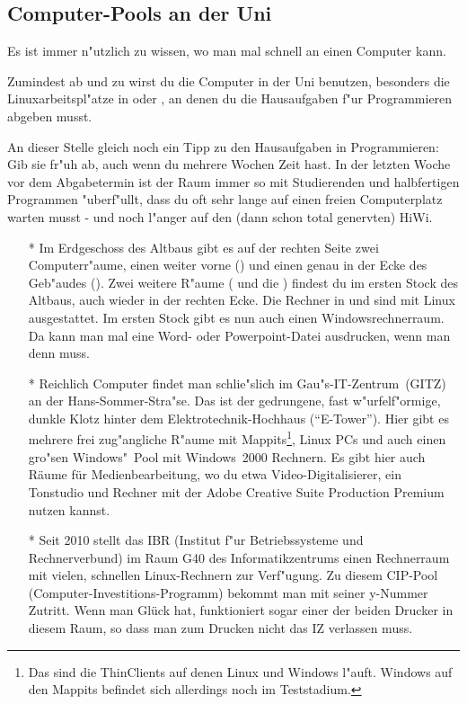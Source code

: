 \subsection{Computer-Pools an der Uni}
Es ist immer n"utzlich zu wissen, wo man mal schnell an einen Computer kann.

Zumindest ab und zu wirst du die Computer in der Uni benutzen, besonders
die Linuxarbeitspl"atze in  oder , an denen du die Hausaufgaben f"ur
Programmieren abgeben musst.

{\small
An dieser Stelle gleich noch ein Tipp zu den Hausaufgaben in Programmieren:
Gib sie fr"uh ab, auch wenn du mehrere Wochen Zeit hast. In der letzten Woche
vor dem Abgabetermin ist der Raum immer so mit Studierenden und halbfertigen
Programmen "uberf"ullt, dass du oft sehr lange auf einen freien Computerplatz
warten musst - und noch l"anger auf den (dann schon total genervten) HiWi.
}

\begin{itemize}

\item[*] Im Erdgeschoss des Altbaus gibt es auf der rechten Seite zwei
Computerr"aume, einen weiter vorne () und einen genau in der Ecke
des Geb"audes (). Zwei weitere R"aume ( und die
) findest du im ersten Stock des Altbaus, auch wieder in
der rechten Ecke. Die Rechner in  und  sind mit Linux
ausgestattet. Im ersten Stock gibt es nun auch einen Windowsrechnerraum. Da kann man mal eine Word- oder
Powerpoint-Datei ausdrucken, wenn man denn muss.

\item[*] Reichlich Computer findet man schlie"slich im Gau"s-IT-Zentrum~(GITZ) an der
Hans-Sommer-Stra"se. Das ist der gedrungene, fast w"urfelf"ormige, dunkle
Klotz hinter dem Elektrotechnik-Hochhaus ("`E-Tower"'). Hier gibt es mehrere frei
zug"angliche R"aume mit Mappits\footnote{Das sind die ThinClients auf denen
Linux und Windows l"auft. Windows auf den Mappits befindet sich allerdings noch
im Teststadium.}, Linux PCs und auch einen gro"sen Windows"~Pool mit
Windows~2000 Rechnern. Es gibt hier auch Räume für Medienbearbeitung, wo du etwa
Video-Digitalisierer, ein Tonstudio und Rechner mit der Adobe Creative Suite 
Production Premium nutzen kannst.

\item[*] Seit 2010 stellt das IBR (Institut f"ur Betriebssysteme und Rechnerverbund)
im Raum G40 des Informatikzentrums einen Rechnerraum mit vielen, schnellen Linux-Rechnern 
zur Verf"ugung. Zu diesem CIP-Pool (Computer-Investitions-Programm) bekommt man mit 
seiner y-Nummer Zutritt. Wenn man Glück hat, funktioniert sogar einer der beiden Drucker
in diesem Raum, so dass man zum Drucken nicht das IZ verlassen muss.

\end{itemize}

